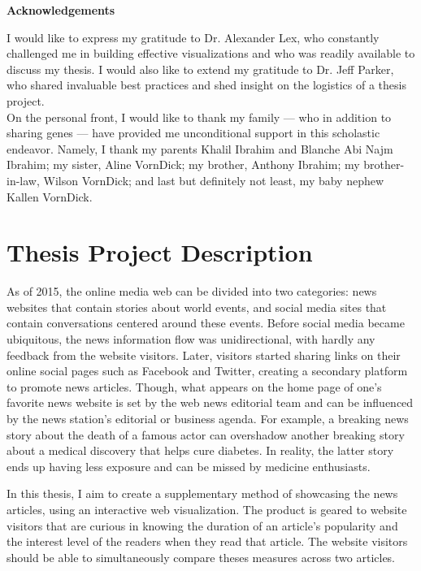 \documentclass[12pt]{article}
\begin{document}
\newpage

\begin{center}
\Large\textbf{Acknowledgements}
\end{center}

I would like to express my gratitude to Dr. Alexander Lex, who constantly challenged me in building effective visualizations and who was readily available to discuss my thesis. I would also like to extend my gratitude to Dr. Jeff Parker, who shared invaluable best practices and shed insight on the logistics of a thesis project. \\

On the personal front, I would like to thank my family --- who in addition to sharing genes --- have provided me unconditional support in this scholastic endeavor. Namely, I thank my parents Khalil Ibrahim and Blanche Abi Najm Ibrahim; my sister, Aline VornDick; my brother, Anthony Ibrahim; my brother-in-law, Wilson VornDick; and last but definitely not least, my baby nephew Kallen VornDick.

\newpage

\begin{singlespace}
\tableofcontents
\end{singlespace}

\newpage


\section{Thesis Project Description}
As of 2015, the online media web can be divided into two categories: news websites that contain stories about world events, and social media sites that contain conversations centered around these events. Before social media became ubiquitous, the news information flow was unidirectional, with hardly any feedback from the website visitors. Later, visitors started sharing links on their online social pages such as Facebook and Twitter, creating a secondary platform to promote news articles. Though, what appears on the home page of one's favorite news website is set by the web news editorial team and can be influenced by the news station's editorial or business agenda. For example, a breaking news story about the death of a famous actor can overshadow another breaking story about a medical discovery that helps cure diabetes. In reality, the latter story ends up having less exposure and can be missed by medicine enthusiasts.  

In this thesis, I aim to create a supplementary method of showcasing the news articles, using an interactive web visualization. The product is geared to website visitors that are curious in knowing the duration of an article's popularity and the interest level of the readers when they read that article. The website visitors should be able to simultaneously compare theses measures across two articles. 
\end{document}
